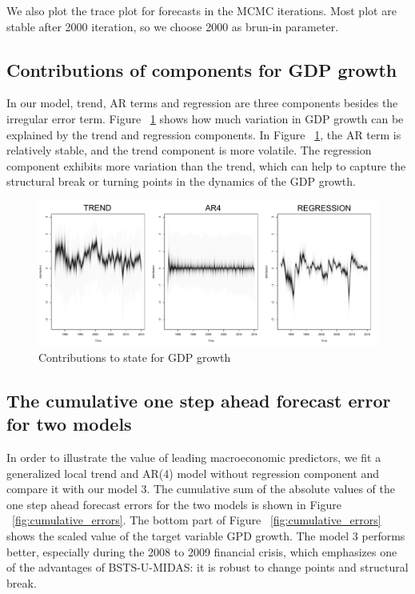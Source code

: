 We also plot the trace plot for forecasts in the MCMC iterations. Most plot are stable after 2000 iteration, so we choose 2000 as brun-in parameter. 


\subsection{Contributions of components for GDP growth}

In our model, trend, AR terms and regression are three components besides the irregular error term. 
Figure  ~\ref{fig:components} shows how much variation in GDP growth can be explained by the trend and regression components. In Figure  ~\ref{fig:components}, the AR term is relatively stable, and the trend component is more volatile. The regression component exhibits more variation than the trend, which can help to capture the structural break or turning points in the  dynamics of the GDP growth. 


\begin{figure}[ht]
	\centering
	\includegraphics[width=1\linewidth]{Figures/components}
	\caption{Contributions to state for GDP growth}
	\label{fig:components}
\end{figure}




\subsection{The cumulative one step ahead forecast error for two models}

In order to illustrate the value of leading macroeconomic predictors, we fit a generalized local trend and AR(4) model without regression component and compare it with our model 3.  The cumulative sum of the absolute values of the one step ahead forecast errors for the two models is shown in Figure ~\ref{fig:cumulative_errors}. The bottom part of Figure ~\ref{fig:cumulative_errors} shows the scaled value of the target variable GPD growth. The model 3 performs better, especially during the 2008 to 2009 financial crisis, which emphasizes one of the advantages of BSTS-U-MIDAS: it is robust to change points and structural break.


